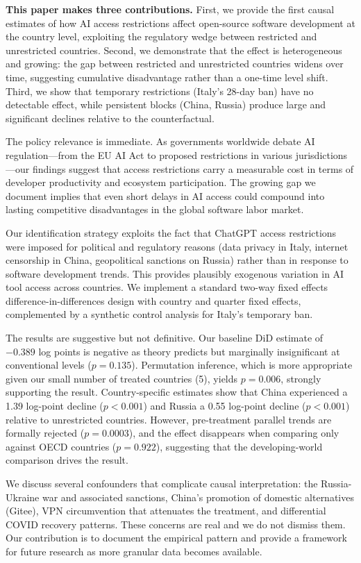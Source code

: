 \documentclass[12pt]{article}
\begin{document}
\textbf{This paper makes three contributions.} First, we provide the first causal estimates of how AI access restrictions affect open-source software development at the country level, exploiting the regulatory wedge between restricted and unrestricted countries. Second, we demonstrate that the effect is heterogeneous and growing: the gap between restricted and unrestricted countries widens over time, suggesting cumulative disadvantage rather than a one-time level shift. Third, we show that temporary restrictions (Italy's 28-day ban) have no detectable effect, while persistent blocks (China, Russia) produce large and significant declines relative to the counterfactual.

The policy relevance is immediate. As governments worldwide debate AI regulation---from the EU AI Act to proposed restrictions in various jurisdictions---our findings suggest that access restrictions carry a measurable cost in terms of developer productivity and ecosystem participation. The growing gap we document implies that even short delays in AI access could compound into lasting competitive disadvantages in the global software labor market.

Our identification strategy exploits the fact that ChatGPT access restrictions were imposed for political and regulatory reasons (data privacy in Italy, internet censorship in China, geopolitical sanctions on Russia) rather than in response to software development trends. This provides plausibly exogenous variation in AI tool access across countries. We implement a standard two-way fixed effects difference-in-differences design with country and quarter fixed effects, complemented by a synthetic control analysis for Italy's temporary ban.

The results are suggestive but not definitive. Our baseline DiD estimate of $-0.389$ log points is negative as theory predicts but marginally insignificant at conventional levels ($p = 0.135$). Permutation inference, which is more appropriate given our small number of treated countries (5), yields $p = 0.006$, strongly supporting the result. Country-specific estimates show that China experienced a 1.39 log-point decline ($p < 0.001$) and Russia a 0.55 log-point decline ($p < 0.001$) relative to unrestricted countries. However, pre-treatment parallel trends are formally rejected ($p = 0.0003$), and the effect disappears when comparing only against OECD countries ($p = 0.922$), suggesting that the developing-world comparison drives the result.

We discuss several confounders that complicate causal interpretation: the Russia-Ukraine war and associated sanctions, China's promotion of domestic alternatives (Gitee), VPN circumvention that attenuates the treatment, and differential COVID recovery patterns. These concerns are real and we do not dismiss them. Our contribution is to document the empirical pattern and provide a framework for future research as more granular data becomes available.
\end{document}
